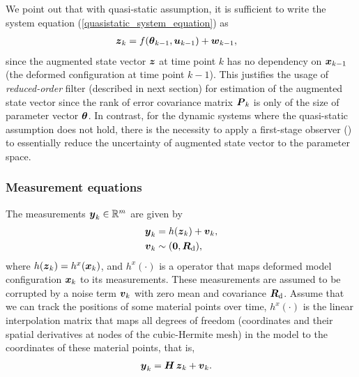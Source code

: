 \begin{rem}
\label{se-remark-quasitatic}
    We point out that with quasi-static assumption, it is sufficient to write the system equation (\ref{quasistatic_system_equation}) as
    \begin{align}
        \vect{z}_k &= f(\vect{\theta}_{k-1},\vect{u}_{k-1}) + \vect{w}_{k-1},
    \end{align}
    since the augmented state vector $\vect{z}$ at time point $k$ has no dependency on $\vect{x}_{k-1}$ (the deformed configuration at time point $k-1$). This justifies the usage of \emph{reduced-order} filter (described in next section) for estimation of the augmented state vector since the rank of error covariance matrix $\matr{P}_k$ is only of the size of parameter vector $\vect{\theta}$.
    In contrast, for the dynamic systems where the quasi-static assumption does not hold, there is the necessity to apply a first-stage observer (\citealt{Moireau2008Joint}) to essentially reduce the uncertainty of augmented state vector to the parameter space.
\end{rem}

\subsubsection*{Measurement equations}

The measurements $\vect{y}_k \in \Real^{m}$ are given by
\begin{align}
\vect{y}_k &= h(\vect{z}_k)  + \vect{v}_k , \label{eq-measurement}\\
\vect{v}_k &\sim (\vect{0},\matr{R}_\textnormal{d}) , \label{eq-measurement02}
\end{align}
where $h(\vect{z}_k)=h^x(\vect{x}_k)$, and $h^x(\cdot)$ is a operator that maps deformed model configuration $\vect{x}_k$ to its measurements. These measurements are assumed to be corrupted by a noise term $\vect{v}_k$ with zero mean and covariance $\matr{R}_\textnormal{d}$. Assume that we can track the positions of some material points over time, $h^x(\cdot)$ is the linear interpolation matrix that maps all degrees of freedom (coordinates and their spatial derivatives at nodes of the cubic-Hermite mesh) in the model to the coordinates of these material points, that is,
\begin{align}
\vect{y}_k &= \matr{H} \, \vect{z}_k  + \vect{v}_k . \label{eq-measurement03}
\end{align}

